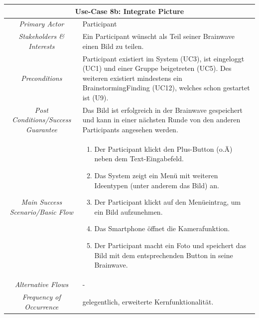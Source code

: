 \renewcommand{\arraystretch}{1.35}
\begin{center}
	\begin{longtable}{| c | p{7cm} |}
		\hline
		\multicolumn{2}{|c|}{\textbf{Use-Case 8b: Integrate Picture}}\\
		\hline\hline
		\textit{Primary Actor} & Participant\\
		\hline
		\textit{Stakeholders \& Interests} & Ein Participant wünscht als Teil seiner Brainwave einen Bild zu teilen. \\
		\hline
		\textit{Preconditions} & Participant existiert im System (UC3), ist eingeloggt (UC1) und einer Gruppe beigetreten (UC5). Des weiteren existiert mindestens ein BrainstormingFinding (UC12), welches schon gestartet ist (U9).\\
		\hline
		\textit{Post Conditions/Success Guarantee} & Das Bild ist erfolgreich in der Brainwave gespeichert und kann in einer nächsten Runde von den anderen Participants angesehen werden.\\
		\hline
		\textit{Main Success Scenario/Basic Flow} & 
		\begin{enumerate}[noitemsep]
			\item Der Participant klickt den Plus-Button (o.Ä) neben dem Text-Eingabefeld.
			\item Das System zeigt ein Menü mit weiteren Ideentypen (unter anderem das Bild) an.
			\item Der Participant klickt auf den Menüeintrag, um ein Bild aufzunehmen.
			\item Das Smartphone öffnet die Kamerafunktion.
			\item Der Participant macht ein Foto und speichert das Bild mit dem entsprechenden Button in seine Brainwave. 
		\end{enumerate}\\
		\hline
		\textit{Alternative Flows} &
		- \\
		\hline
		\textit{Frequency of Occurrence} & gelegentlich, erweiterte Kernfunktionalität.\\
		\hline
	\end{longtable}
\end{center}

